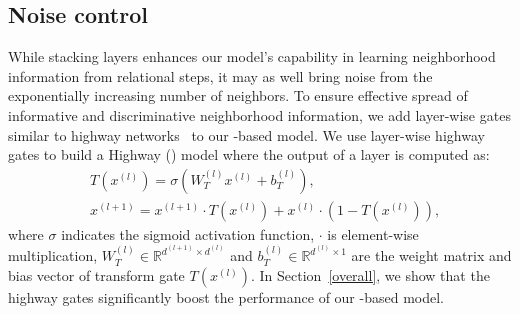 	


	\subsection{Noise control}
	\label{section:hgcn}
	While stacking \RGCN layers enhances our model's capability in learning neighborhood information from relational steps, it may as well
bring noise from the exponentially increasing number of neighbors. To ensure effective spread of informative and discriminative
neighborhood information, we add layer-wise gates similar to highway networks~\cite{Srivastava2015Highway} to our \RGCN-based model.
We use layer-wise highway gates to build a Highway \RGCN (\HRGCN) model where the output of a \HRGCN layer is computed as:
	\begin{equation}
	\begin{split}
	&T(x^{(l)})=\sigma(W_T^{(l)}x^{(l)}+b_T^{(l)}), \\
	&x^{(l+1)}=x^{(l+1)} \cdot T(x^{(l)})+x^{(l)} \cdot (1-T(x^{(l)})),
	\end{split}
	\end{equation}
	where $\sigma$ indicates the sigmoid activation function, $\cdot$ is element-wise multiplication, $W_T^{(l)} \in \mathbb{R}^{d^{(l+1)}
\times d^{(l)}}$ and $b_T^{(l)} \in \mathbb{R}^{d^{(l)} \times 1}$ are the weight matrix and bias vector of transform gate $T(x^{(l)})$.
    In Section~\ref{overall}, we show that the highway gates significantly boost the performance of our \RGCN-based model.
	
